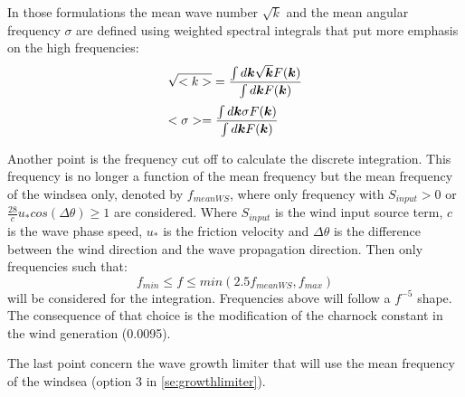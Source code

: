  In those formulations the mean wave number $\sqrt{k}$
 and the mean angular frequency $\sigma$ are defined using weighted spectral integrals that put more emphasis on the high frequencies:
$$
\barr{l}
\dsp \sqrt{<k>}=\frac{\int d \vec{k}\sqrt{\vec{k}}F(\vec{k})}{\int d \vec{k}F(\vec{k})} \\[12pt]
\dsp <\sigma>=\frac{\int d \vec{k}\sigma F(\vec{k})}{\int d \vec{k}F(\vec{k})}
\earr
$$

 Another point is the frequency cut off to calculate the discrete integration. This frequency is no longer a function of the mean frequency but the mean frequency of the windsea only, denoted by $f_{meanWS}$, where only frequency with $S_{input}>0$ or $\frac{28}{c}u_*cos(\Delta  \theta) \ge 1$  are considered. Where $S_{input}$ is the wind input source term, $c$ is the wave phase speed, $u_*$ is the friction velocity and $\Delta  \theta$ is the difference between the wind direction and the wave propagation direction. Then only frequencies such that:
$$
f_{min}\le f \le min(2.5 f_{meanWS},f_{max})
$$
 will be considered for the integration. Frequencies above will follow a $f^{-5}$ shape. The consequence of that choice is the modification of the charnock constant in the wind generation (0.0095).

 The last point concern the wave growth limiter that will use the mean frequency of the windsea (option 3 in \ref{se:growthlimiter}). 